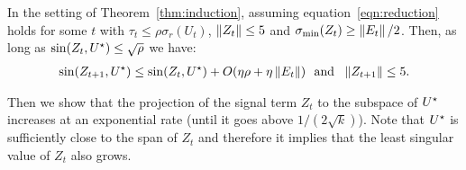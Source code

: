 \begin{prop}\label{prop:low-rank-relative-error}
	In the setting of Theorem~\ref{thm:induction}, assuming equation~\eqref{eqn:reduction} holds for  some $t$ with $\tau_t \le \rho \sigma_{r}(U_t)$, $\left\|Z_t\right\| \leq 5$ and $\sigma_{\min}(Z_{t}) \geq \left\|E_t\right\| / 2$. Then, as long as $\sin(Z_{t}, {{U}^\star})  \le \sqrt{\rho}$ we have:
	\begin{align}
	\sin(Z_{t+1}, {{U}^\star}) \leq \sin(Z_{t}, {{U}^\star}) + O(\eta \rho + \eta \left\|E_t\right\|)  ~\text{ and }~ \left\|Z_{t + 1}\right\| \leq 5. \label{eqn:Zt}
	\end{align}
\end{prop}
Then we show that the projection of the signal term $Z_t$ to the subspace of ${{U}^\star}$ increases at an exponential rate (until it goes above $1/(2\sqrt{k})$). Note that ${{U}^\star}$ is sufficiently close to the span of $Z_t$ and therefore it implies that the least singular value of $Z_t$ also grows. 


